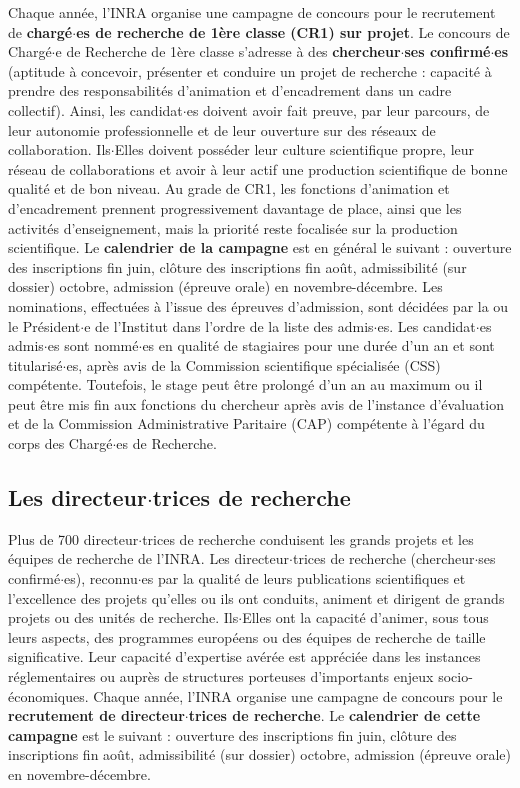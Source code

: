Chaque ann\'ee, l'INRA organise une campagne de concours pour le recrutement de {\bf charg\'e$\cdot$es de recherche de 1\`ere classe (CR1) sur projet}. Le concours de Charg\'e$\cdot$e de Recherche de 1\`ere classe s'adresse \`a des {\bf chercheur$\cdot$ses confirm\'e$\cdot$es} (aptitude \`a concevoir, pr\'esenter et conduire un projet de recherche : capacit\'e \`a prendre des responsabilit\'es d'animation et d'encadrement dans un cadre collectif). Ainsi, les candidat$\cdot$es doivent avoir fait preuve, par leur parcours, de leur autonomie professionnelle et de leur ouverture sur des r\'eseaux de collaboration. Ils$\cdot$Elles doivent poss\'eder leur culture scientifique propre, leur r\'eseau de collaborations et avoir \`a leur actif une production scientifique de bonne qualit\'e et de bon niveau. Au grade de CR1, les fonctions d'animation et d'encadrement prennent progressivement davantage de place, ainsi que les activit\'es d'enseignement, mais la priorit\'e reste focalis\'ee sur la production scientifique. Le {\bf calendrier de la campagne} est en g\'en\'eral le suivant : ouverture des inscriptions fin juin, cl\^oture des inscriptions fin ao\^ut, admissibilit\'e (sur dossier) octobre, admission (\'epreuve orale) en novembre-d\'ecembre.  Les nominations, effectu\'ees \`a l'issue des \'epreuves d'admission, sont d\'ecid\'ees par la ou le Pr\'esident$\cdot$e de l'Institut dans l'ordre de la liste des admis$\cdot$es. Les candidat$\cdot$es admis$\cdot$es sont nomm\'e$\cdot$es en qualit\'e de stagiaires pour une dur\'ee d'un an et sont titularis\'e$\cdot$es, apr\`es avis de la Commission scientifique sp\'ecialis\'ee (CSS) comp\'etente. Toutefois, le stage peut \^etre prolong\'e d'un an au maximum ou il peut \^etre mis fin aux fonctions du chercheur apr\`es avis de l'instance d'\'evaluation et de la Commission Administrative Paritaire (CAP) comp\'etente \`a l'\'egard du corps des Charg\'e$\cdot$es de Recherche.

\subsection{ Les directeur$\cdot$trices de recherche}
Plus de 700 directeur$\cdot$trices de recherche conduisent les grands projets et les \'equipes de recherche de l'INRA. Les directeur$\cdot$trices de recherche (chercheur$\cdot$ses confirm\'e$\cdot$es), reconnu$\cdot$es par la qualit\'e de leurs publications scientifiques et l'excellence des projets qu'elles ou ils ont conduits, animent et dirigent de grands projets ou des unit\'es de recherche. Ils$\cdot$Elles ont la capacit\'e d'animer, sous tous leurs aspects, des programmes europ\'eens ou des \'equipes de recherche de taille significative. Leur capacit\'e d'expertise av\'er\'ee est appr\'eci\'ee dans les instances r\'eglementaires ou aupr\`es de structures porteuses d'importants enjeux socio-\'economiques. Chaque ann\'ee, l'INRA organise une campagne de concours pour le {\bf recrutement de directeur$\cdot$trices de recherche}. Le {\bf calendrier de cette campagne} est le suivant : ouverture des inscriptions fin juin, cl\^oture des inscriptions fin ao\^ut, admissibilit\'e (sur dossier) octobre, admission (\'epreuve orale) en novembre-d\'ecembre.

